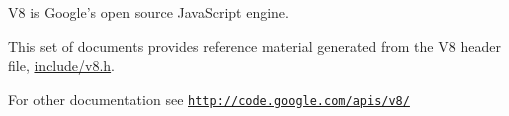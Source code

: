 V8 is Google's open source Java\-Script engine.

This set of documents provides reference material generated from the V8 header file, \hyperlink{v8_8h_source}{include/v8.\-h}.

For other documentation see \href{http://code.google.com/apis/v8/}{\tt http\-://code.\-google.\-com/apis/v8/} 
